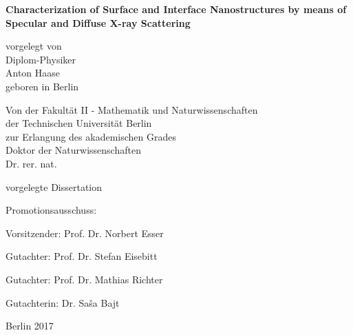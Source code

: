 
\begin{titlepage}
{\noindent\sffamily\large%
    \begin{center}
        \vspace*{3ex}
        {\LARGE\bfseries\sffamily
           Characterization of Surface and Interface Nanostructures by means of Specular and Diffuse X-ray Scattering
        }
        \vspace{1cm}

        vorgelegt von \\
        Diplom-Physiker \\
        Anton Haase \\
        geboren in Berlin \\
        \vspace{4cm}

        Von der Fakultät II - Mathematik und Naturwissenschaften \\
        der Technischen Universität Berlin \\
        zur Erlangung des akademischen Grades \\
        Doktor der Naturwissenschaften \\
        Dr. rer. nat. \\
        \vspace{3ex}

        vorgelegte Dissertation \\
        \vspace{2cm}
    \end{center}

    Promotionsausschuss:
    \vspace{2ex}

    Vorsitzender: Prof. Dr. Norbert Esser

    Gutachter: Prof. Dr. Stefan Eisebitt

    Gutachter: Prof. Dr. Mathias Richter

    Gutachterin: Dr. Sa\v{s}a Bajt
    \vspace{1ex}


    \begin{center}
        Berlin 2017
    \end{center}
}
\end{titlepage}

\cleardoublepage

